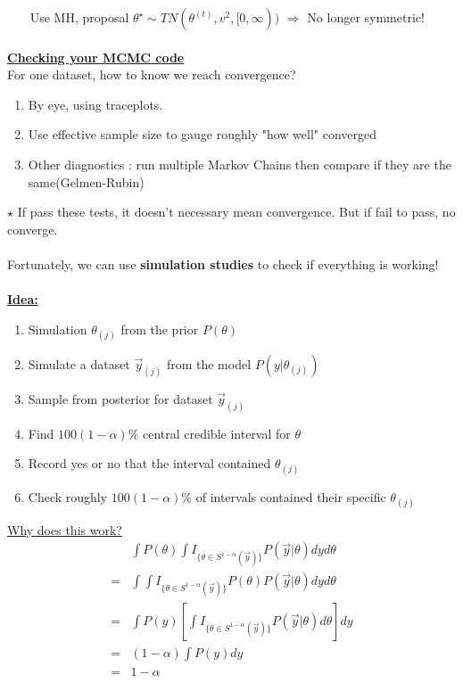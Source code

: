 \documentclass[11pt,a4paper]{article}
\begin{document}
\indent $\,\quad\,\,$ Use MH, proposal $\theta^{\star}\sim TN(\theta^{(t)},v^2,[0,\infty))$ $\Rightarrow$ No longer symmetric!\\
\\
\textbf{\underline{Checking your MCMC code}}\\
\noindent For one dataset, how to know we reach convergence?\begin{enumerate}
  \item By eye, using traceplots.
  \item Use effective sample size to gauge roughly "how well" converged
  \item Other diagnostics : run multiple Markov Chains then compare if they are the same(Gelmen-Rubin)
\end{enumerate}
$\star$ If pass these tests, it doesn't necessary mean convergence. But if fail to pass, no converge.\\
\\
\noindent
Fortunately, we can use \textbf{simulation studies} to check if everything is working!\\
\\
\underline{\textbf{Idea:}}\begin{enumerate}
                   \item Simulation $\theta_{(j)}$ from the prior $P(\theta)$
                   \item Simulate a dataset $\overrightarrow{y}_{(j)}$ from the model $P(y|\theta_{(j)})$
                   \item Sample from posterior for dataset $\overrightarrow{y}_{(j)}$
                   \item Find $100(1-\alpha)\%$ central credible interval for $\theta$
                   \item Record yes or no that the interval contained $\theta_{(j)}$
                   \item Check roughly $100(1-\alpha)\%$ of intervals contained their specific $\theta_{(j)}$
                 \end{enumerate}
\underline{Why does this work?}
\begin{align*}
    &\int P(\theta) \int I_{\{\theta\in S^{1-\alpha}(\overrightarrow{y})\}}P(\overrightarrow{y}|\theta)dyd\theta\\
    =& \int \int I_{\{\theta\in S^{1-\alpha}(\overrightarrow{y})\}}P(\theta)P(\overrightarrow{y}|\theta)dyd\theta\\
    =&\int P(y)[\int I_{\{\theta\in S^{1-\alpha}(\overrightarrow{y})\}}P(\overrightarrow{y}|\theta)d\theta]dy\\
    =&(1-\alpha) \int P(y)dy \\
    =& 1-\alpha\\
\end{align*}
\end{document}
